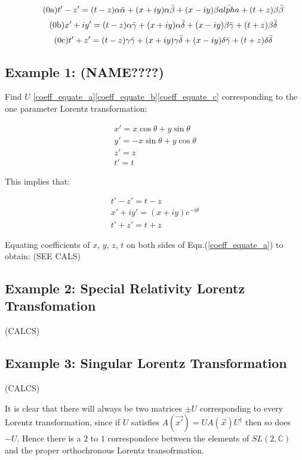 \begin{equation}\label{coeff_equate_a}
\tag{{\theequation}a}
t' - z' = (t-z)\alpha\bar{\alpha} + (x + iy)\alpha\bar{\beta} + (x - iy)\beta\bar{alpha} + (t+z)\beta\bar{\beta}
\end{equation}
\begin{equation}\label{coeff_equate_b}
\tag{{\theequation}b}
x' + iy' = (t-z)\alpha\bar{\gamma} + (x + iy)\alpha\bar{\delta} + (x-iy)\beta\bar{\gamma} + (t+z)\beta\bar{\delta}
\end{equation}
\begin{equation}\label{coeff_equate_c}
\tag{{\theequation}c}
t' + z' = (t-z)\gamma\bar{\gamma} + (x + iy)\gamma\bar{\delta} + (x-iy)\delta\bar{\gamma} + (t+z)\delta\bar{\delta}
\end{equation}

\subsection{Example 1: (NAME????)}

\noindent Find $U$ \ref{coeff_equate_a}\ref{coeff_equate_b}\ref{coeff_equate_c} corresponding to the one parameter Lorentz transformation:

\begin{eqnarray*} 
x' = x\cos{\theta} + y\sin{\theta} \\
y' = -x\sin{\theta} + y\cos{\theta} \\
z' = z \\
t' = t
\end{eqnarray*} 

\noindent This implies that:

\begin{eqnarray*}
t'-z' = t-z \\
x'+iy' = (x+iy) e^{-i \theta} \\
t'+z' = t+z
\end{eqnarray*}

Equating coefficients of $x$, $y$, $z$, $t$ on both sides of Eqn.(\ref{coeff_equate_a}) to obtain: (SEE CALS)

\subsection{Example 2: Special Relativity Lorentz Transfomation}

(CALCS)

\subsection{Example 3: Singular Lorentz Transformation}

(CALCS)

It is clear that there will always be two matrices $\pm U$ corresponding to every Lorentz transformation, since if $U$ satisfies $A(\vec{x'}) = U A(\vec{x}) U^{\dagger}$ then so does $-U$. Hence there is a $2$ to $1$ correspondece between the elements of $SL(2,\mathbb{C})$ and the proper orthochronous Lorentz transofrmation.
